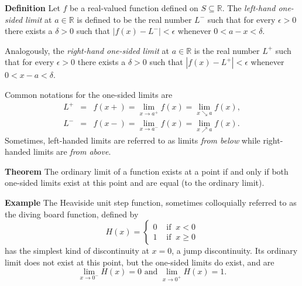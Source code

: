 \documentclass[12pt]{article}
\newcommand{\sR}[0]{\mathbb{R}}
\begin{document}
{\bf Definition}
Let $f$ be a real-valued function defined on $S \subseteq \sR$.  The \emph{left-hand one-sided 
limit} at $a\in \sR$ is defined to be the real number $L^-$ such that for every $\epsilon > 0$ there 
exists a $\delta > 0$ such that $|f(x) - L^-| < \epsilon$ whenever $0 < a - x < \delta$.

Analogously, the \emph{right-hand one-sided limit} at $a\in \sR$ is the 
real number $L^+$ such that 
for every $\epsilon > 0$ there exists a $\delta > 0$ such that $|f(x) - L^+| < \epsilon$ whenever
$0 < x - a < \delta$.  

Common notations for the one-sided limits are
\begin{eqnarray*}
L^+ &=& f(x+) = \lim_{x \to a^+} f(x) =\lim_{x \searrow a} f(x), \\
L^-  &=&f(x-) = \lim_{x \to a^-} f(x) =\lim_{x \nearrow a} f(x).
\end{eqnarray*}
Sometimes, left-handed limits are referred to as limits \emph{from below} while 
right-handed limits are \emph{from above}.  

{\bf Theorem} The ordinary limit of a function exists at a point if and only 
if both one-sided limits exist at this point and are equal (to the ordinary limit).

{\bf Example}
The Heaviside unit step function, sometimes colloquially referred to as the diving board function,
defined by
\[
H(x) = 
 \begin{cases}
  0& \mbox{ if } ~x < 0 \\
  1& \mbox{ if } ~x \geq 0
 \end{cases}
\]
has the simplest kind of discontinuity at $x = 0$, a jump discontinuity.   Its ordinary limit does not exist at this point, but the one-sided limits do exist, and are
\[
\lim_{x \to 0^-} H(x) = 0 \mbox{ and } \lim_{x \to 0^+} H(x) = 1.
\]
\end{document}
